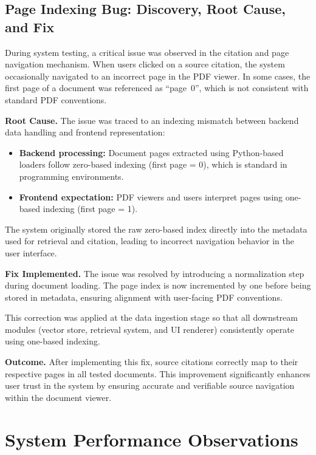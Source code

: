 \subsection{Page Indexing Bug: Discovery, Root Cause, and Fix}

During system testing, a critical issue was observed in the citation and
page navigation mechanism. When users clicked on a source citation, the
system occasionally navigated to an incorrect page in the PDF viewer.
In some cases, the first page of a document was referenced as ``page~0'',
which is not consistent with standard PDF conventions.

\medskip
\noindent\textbf{Root Cause.}
The issue was traced to an indexing mismatch between backend data handling
and frontend representation:

\begin{itemize}[leftmargin=1.5em, itemsep=3pt]
    \item \textbf{Backend processing:} Document pages extracted using
    Python-based loaders follow zero-based indexing (first page = 0),
    which is standard in programming environments.
    
    \item \textbf{Frontend expectation:} PDF viewers and users interpret
    pages using one-based indexing (first page = 1).
\end{itemize}

The system originally stored the raw zero-based index directly into the
metadata used for retrieval and citation, leading to incorrect navigation
behavior in the user interface.

\medskip
\noindent\textbf{Fix Implemented.}
The issue was resolved by introducing a normalization step during
document loading. The page index is now incremented by one before being
stored in metadata, ensuring alignment with user-facing PDF conventions.

This correction was applied at the data ingestion stage so that all
downstream modules (vector store, retrieval system, and UI renderer)
consistently operate using one-based indexing.

\medskip
\noindent\textbf{Outcome.}
After implementing this fix, source citations correctly map to their
respective pages in all tested documents. This improvement significantly
enhances user trust in the system by ensuring accurate and verifiable
source navigation within the document viewer.
\section{System Performance Observations}

